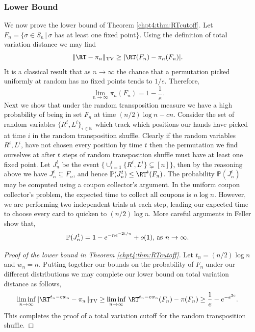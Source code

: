 \documentclass[11pt]{report}
\begin{document}
\subsubsection{Lower Bound}
We now prove the lower bound of Theorem \ref{chpt4:thm:RTcutoff}. Let $
F_{n} = \{\sigma \in S_{n} \,| \, \sigma $ has at least one 
fixed point$\}$. Using the definition of total variation distance we may 
find
\[\lVert \RT - \pi_{n} \rVert_{\tiny \textnormal{TV}} \geq | \RT(F_{n}) - 
\pi_{n}(F_{n}) | .\]
It is a classical result \cite{feller2008introduction} that as $n\rightarrow \infty$ the chance that a permutation picked uniformly at random has no fixed points tends to $1/e$. Therefore,
\[\lim_{n\to\infty} \pi_{n}(F_{n}) = 1 - \frac{1}{e}.\]
Next we show that under the random transposition measure we have a 
high probability of being in set $F_{n}$ at time $(n/2)\log n -cn$. 
Consider the set of random variables $\{R^{i},L^{i}\}_{i\in\mathbb{N}}$ which track 
which positions our hands have picked at time $i$ in the random transposition shuffle. Clearly if the random 
variables $R^{i},L^{i}$, have not chosen every position by time $t$ then 
the permutation 
we find ourselves at after $t$ steps of random transposition shuffle must have at least one 
fixed point. Let $J_{n}^{t}$ be the event $\{\cup_{i=1}^{t}\{R^{i},L^{i}\} 
\subsetneq [n]\}$, then by the reasoning above we have $J_{n}^{t}\subseteq 
F_{n}$, and hence $\mathbb{P}(J_{n}^{t}) \leq \RT^{t}(F_{n})$. The 
probability $\mathbb{P}(J_{n}^{t})$ may be computed using a coupon collector's 
argument. In the uniform coupon collector's problem, the expected time to 
collect all coupons is $n\log n$. However, we are performing two independent 
trials at each step, leading our expected time to choose every card to quicken to $(n/2)\log n$. More careful arguments in Feller 
\cite[Section IV.2]{feller2008introduction} show that,
\[\mathbb{P}(J_{n}^{t}) = 1 - e^{-ne^{-2t/n}} + o(1) \textnormal{, as } n\to \infty .\]
\begin{proof}[Proof of the lower bound in Theorem \ref{chpt4:thm:RTcutoff}]
	Let $t_{n} = (n/2)\log n$ and $w_{n} =n$. Putting together our bounds on the probability of $F_{n}$ under our different distributions we may complete our lower bound on total variation distance as follows,
	\[\liminf_{n\to\infty}\lVert \RT^{t_{n} -cw_{n}} - \pi_{n} \rVert_{\tiny \textnormal{TV}} \geq \liminf_{n\to\infty} \, \RT^{t_{n} -cw_{n}}(F_{n}) - \pi(F_{n})\geq 	\frac{1}{e} - e^{-e^{2c}} .\]
	This completes the proof of a total variation cutoff for the random transposition shuffle.
\end{proof}
\end{document}
